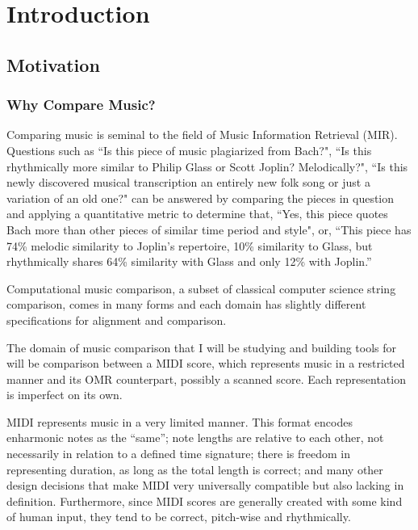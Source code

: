 \chapter{Introduction}

\section{Motivation}
\subsection{Why Compare Music?}
Comparing music is seminal to the field of Music Information Retrieval (MIR). Questions such as ``Is this piece of music plagiarized from Bach?", ``Is this rhythmically more similar to Philip Glass or Scott Joplin? Melodically?", ``Is this newly discovered musical transcription an entirely new folk song or just a variation of an old one?" can be answered by comparing the pieces in question and applying a quantitative metric to determine that, ``Yes, this piece quotes Bach more than other pieces of similar time period and style", or, ``This piece has 74\% melodic similarity to Joplin's repertoire, 10\% similarity to Glass, but rhythmically shares 64\% similarity with Glass and only 12\% with Joplin.''

Computational music comparison, a subset of classical computer science string comparison, comes in many forms and each domain has slightly different specifications for alignment and comparison. 

The domain of music comparison that I will be studying and building tools for will be comparison between a MIDI score, which represents music in a restricted manner and its OMR counterpart, possibly a scanned score. Each representation is imperfect on its own.

MIDI represents music in a very limited manner. This format encodes enharmonic notes as the ``same''; note lengths are relative to each other, not necessarily in relation to a defined time signature; there is freedom in representing duration, as long as the total length is correct; and many other design decisions that make MIDI very universally compatible but also lacking in definition. Furthermore, since MIDI scores are generally created with some kind of human input, they tend to be correct, pitch-wise and rhythmically. 
 

